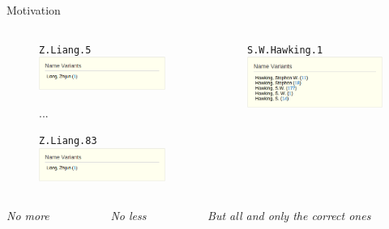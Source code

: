\documentclass{beamer}
\begin{document}
\begin{frame}{Motivation}
{\begin{columns}[T]
\begin{column}{0.33\textwidth}
\begin{figure}
\texttt{Z.Liang.5}
\includegraphics[width=\textwidth]{figures/no-less.png}

...

\texttt{Z.Liang.83}
\includegraphics[width=\textwidth]{figures/no-less.png}
\end{figure}
\end{column}
\begin{column}{0.33\textwidth}
\begin{figure}
\texttt{S.W.Hawking.1}
\includegraphics[width=\textwidth]{figures/exact.png}
\end{figure}
\end{column}

\end{columns}

\begin{columns}[T]
\begin{column}{0.33\textwidth}
\begin{center}{\it No more}\end{center}
\end{column}
\begin{column}{0.33\textwidth}
\begin{center}{\it No less}\end{center}
\end{column}
\begin{column}{0.33\textwidth}
\begin{center}{\it But all and only the correct ones}\end{center}
\end{column}
\end{columns}}
\end{frame}
\end{document}
